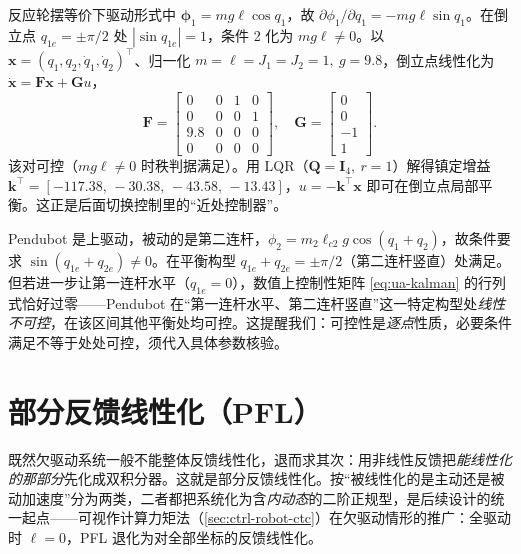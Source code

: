 \begin{example}\label{ex:ua-rwp-control}
反应轮摆等价下驱动形式中 $\boldsymbol{\phi}_1=mg\ell\cos q_1$，故 $\partial\phi_1/\partial q_1=-mg\ell\sin q_1$。在倒立点 $q_{1e}=\pm\pi/2$ 处 $|\sin q_{1e}|=1$，条件 2 化为 $mg\ell\ne0$。以 $\mathbf{x}=(q_1,q_2,\dot{q}_1,\dot{q}_2)^\top$、归一化 $m=\ell=J_1=J_2=1,\ g=9.8$，倒立点线性化为 $\dot{\mathbf{x}}=\mathbf{F}\mathbf{x}+\mathbf{G}u$，
\[
  \mathbf{F}=\begin{bmatrix}0&0&1&0\\0&0&0&1\\9.8&0&0&0\\0&0&0&0\end{bmatrix},\quad
  \mathbf{G}=\begin{bmatrix}0\\0\\-1\\1\end{bmatrix}.
\]
该对可控（$mg\ell\ne0$ 时秩判据满足）。用 LQR（$\mathbf{Q}=\mathbf{I}_4,\ r=1$）解得镇定增益 $\mathbf{k}^\top=[-117.38,\,-30.38,\,-43.58,\,-13.43]$，$u=-\mathbf{k}^\top\mathbf{x}$ 即可在倒立点局部平衡。这正是后面切换控制里的“近处控制器”。
\end{example}

\begin{example}\label{ex:ua-pendubot-control}
Pendubot 是上驱动，被动的是第二连杆，$\phi_2=m_2\ell_{c2}g\cos(q_1+q_2)$，故条件要求 $\sin(q_{1e}+q_{2e})\ne0$。在平衡构型 $q_{1e}+q_{2e}=\pm\pi/2$（第二连杆竖直）处满足。但若进一步让第一连杆水平（$q_{1e}=0$），数值上控制性矩阵 \cref{eq:ua-kalman} 的行列式恰好过零——Pendubot 在“第一连杆水平、第二连杆竖直”这一特定构型处\emph{线性不可控}，在该区间其他平衡处均可控。这提醒我们：可控性是\emph{逐点}性质，必要条件满足不等于处处可控，须代入具体参数核验。
\end{example}

\section{部分反馈线性化（PFL）}\label{sec:ua-pfl}

既然欠驱动系统一般不能整体反馈线性化，退而求其次：用非线性反馈把\emph{能线性化的那部分}先化成双积分器。这就是部分反馈线性化。按“被线性化的是主动还是被动加速度”分为两类，二者都把系统化为含\emph{内动态}的二阶正规型，是后续设计的统一起点——可视作计算力矩法（\cref{sec:ctrl-robot-ctc}）在欠驱动情形的推广：全驱动时 $\ell=0$，PFL 退化为对全部坐标的反馈线性化。

